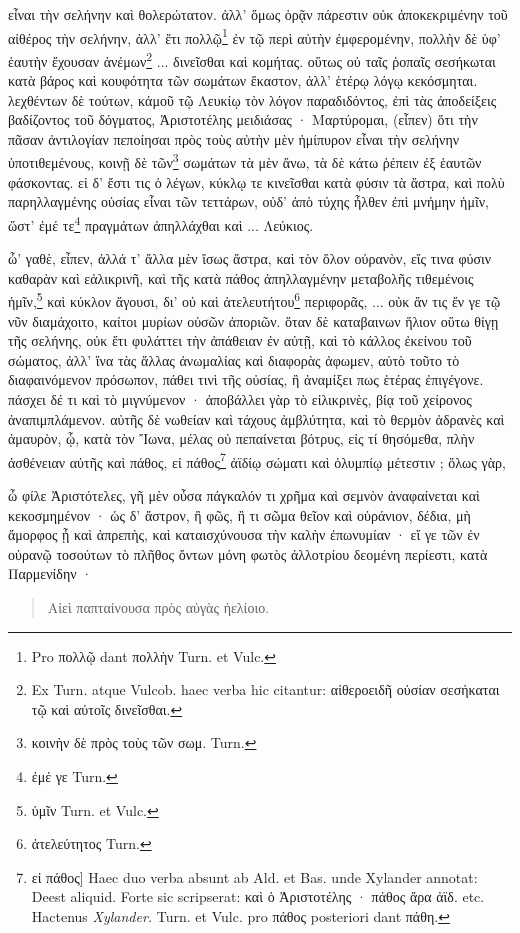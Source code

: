 \documentclass[a4paper, 11pt, oneside, polutonikogreek, german]{article}
\begin{document}
εἶναι τὴν σελήνην καὶ θολερώτατον. ἀλλ' ὅμως ὁρᾷν πάρεστιν οὐκ ἀποκεκριμένην τοῦ αἰθέρος τὴν σελήνην, ἀλλ' ἔτι πολλῷ\footnote{Pro πολλῷ dant πολλὴν Turn. et Vulc.} ἐν τῷ περὶ αὐτὴν ἐμφερομένην, πολλὴν δὲ ὑφ' ἑαυτὴν ἔχουσαν ἀνέμων\footnote{Ex Turn. atque Vulcob. haec verba hic citantur: αἰθεροειδῆ οὐσίαν σεσήκαται τῷ καὶ αὐτοῖς δινεῖσθαι.} ... δινεῖσθαι καὶ κομήτας. οὕτως οὐ ταῖς ῥοπαῖς σεσήκωται κατὰ βάρος καὶ κουφότητα τῶν σωμάτων ἕκαστον, ἀλλ' ἑτέρῳ λόγῳ κεκόσμηται. λεχθέντων δὲ τούτων, κἀμοῦ τῷ Λευκίῳ τὸν λόγον παραδιδόντος, ἐπὶ τὰς ἀποδείξεις βαδίζοντος τοῦ δόγματος, Ἀριστοτέλης μειδιάσας · Μαρτύρομαι, (εἶπεν) ὅτι τὴν πᾶσαν ἀντιλογίαν πεποίησαι πρὸς τοὺς αὐτὴν μὲν ἡμίπυρον εἶναι τὴν σελήνην ὑποτιθεμένους, κοινῇ δὲ τῶν\footnote{κοινὴν δὲ πρὸς τοὺς τῶν σωμ. Turn.} σωμάτων τὰ μὲν ἄνω, τὰ δὲ κάτω ῥέπειν ἐξ ἑαυτῶν φάσκοντας. εἰ δ' ἔστι τις ὁ λέγων, κύκλῳ τε κινεῖσθαι κατὰ φύσιν τὰ ἄστρα, καὶ πολὺ παρηλλαγμένης οὐσίας εἶναι τῶν τεττάρων, οὐδ' ἀπὸ τύχης ἦλθεν ἐπὶ μνήμην ἡμῖν, ὥστ' ἐμέ τε\footnote{ἐμέ γε Turn.} πραγμάτων ἀπηλλάχθαι καὶ ... Λεύκιος.

ὦ' γαθὲ, εἶπεν, ἀλλά τ' ἄλλα μὲν ἴσως ἄστρα, καὶ τὸν ὅλον οὐρανὸν, εἴς τινα φύσιν καθαρὰν καὶ εἀλικρινῆ, καὶ τῆς κατὰ πάθος ἀπηλλαγμένην μεταβολῆς τιθεμένοις ἡμῖν,\footnote{ὑμῖν Turn. et Vulc.} καὶ κύκλον ἄγουσι, δι' οὐ καὶ ἀτελευτήτου\footnote{ἀτελεύτητος Turn.} περιφορᾶς, ... οὐκ ἄν τις ἔν γε τῷ νῦν διαμάχοιτο, καίτοι μυρίων οὐσῶν ἀποριῶν. ὅταν δὲ καταβαινων ἥλιον οὕτω θίγῃ τῆς σελήνης, οὐκ ἔτι φυλάττει τὴν ἀπάθειαν ἐν αὐτῇ, καὶ τὸ κάλλος ἐκείνου τοῦ σώματος, ἀλλ' ἵνα τὰς ἄλλας ἀνωμαλίας καὶ διαφορὰς ἀφωμεν, αὐτὸ τοῦτο τὸ διαφαινόμενον πρόσωπον, πάθει τινὶ τῆς οὐσίας, ἢ ἀναμίξει πως ἑτέρας ἐπιγέγονε. πάσχει δέ τι καὶ τὸ μιγνύμενον · ἀποβάλλει γὰρ τὸ εἰλικρινὲς, βίᾳ τοῦ χείρονος ἀναπιμπλάμενον. αὐτῆς δὲ νωθείαν καὶ τάχους ἀμβλύτητα, καὶ τὸ θερμὸν ἀδρανὲς καὶ ἀμαυρὸν, ᾧ, κατὰ τὸν Ἴωνα, μέλας οὐ πεπαίνεται βότρυς, εἰς τί θησόμεθα, πλὴν ἀσθένειαν αὐτῆς καὶ πάθος, εἰ πάθος\footnote{εἰ πάθος] Haec duo verba absunt ab Ald. et Bas. unde Xylander annotat: Deest aliquid. Forte sic scripserat: καὶ ὁ Ἀριστοτέλης · πάθος ἄρα ἀϊδ. etc. Hactenus \emph{Xylander.} Turn. et Vulc. pro πάθος posteriori dant πάθη.} ἀϊδίῳ σώματι καὶ ὀλυμπίῳ μέτεστιν ; ὅλως γὰρ,

ὦ φίλε Ἀριστότελες, γῆ μὲν οὖσα πάγκαλόν τι χρῆμα καὶ σεμνὸν ἀναφαίνεται καὶ κεκοσμημένον · ὡς δ' ἄστρον, ἢ φῶς, ἢ τι σῶμα θεῖον καὶ οὐράνιον, δέδια, μὴ ἄμορφος ᾖ καὶ ἀπρεπὴς, καὶ καταισχύνουσα τὴν καλὴν ἐπωνυμίαν · εἴ γε τῶν ἐν οὐρανῷ τοσούτων τὸ πλῆθος ὄντων μόνη φωτὸς ἀλλοτρίου δεομένη περίεστι, κατὰ Παρμενίδην ·
\begin{quotation}\small
Αἰεὶ παπταίνουσα πρὸς αὐγὰς ἠελίοιο.
\end{quotation}
\end{document}
